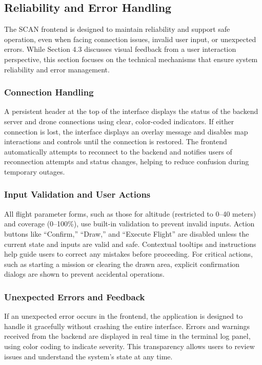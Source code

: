 \subsection{Reliability and Error Handling}
\label{sec:reliability-error-handling}

The SCAN frontend is designed to maintain reliability and support safe operation, even when facing connection issues, invalid user input, or unexpected errors. While Section 4.3 discusses visual feedback from a user interaction perspective, this section focuses on the technical mechanisms that ensure system reliability and error management.

\subsubsection{Connection Handling}
A persistent header at the top of the interface displays the status of the backend server and drone connections using clear, color-coded indicators. If either connection is lost, the interface displays an overlay message and disables map interactions and controls until the connection is restored. The frontend automatically attempts to reconnect to the backend and notifies users of reconnection attempts and status changes, helping to reduce confusion during temporary outages.

\subsubsection{Input Validation and User Actions}
All flight parameter forms, such as those for altitude (restricted to 0--40 meters) and coverage (0--100\%), use built-in validation to prevent invalid inputs. Action buttons like ``Confirm,'' ``Draw,'' and ``Execute Flight'' are disabled unless the current state and inputs are valid and safe. Contextual tooltips and instructions help guide users to correct any mistakes before proceeding. For critical actions, such as starting a mission or clearing the drawn area, explicit confirmation dialogs are shown to prevent accidental operations.

\subsubsection{Unexpected Errors and Feedback}
If an unexpected error occurs in the frontend, the application is designed to handle it gracefully without crashing the entire interface. Errors and warnings received from the backend are displayed in real time in the terminal log panel, using color coding to indicate severity. This transparency allows users to review issues and understand the system's state at any time.

